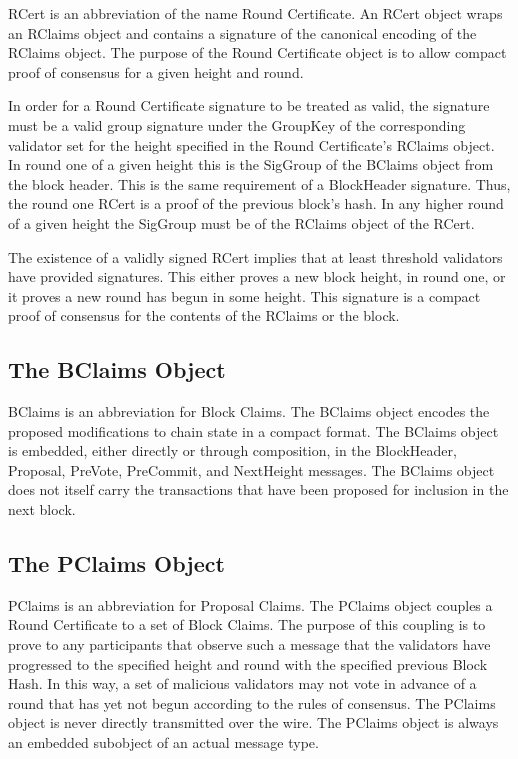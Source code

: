 

RCert is an abbreviation of the name Round Certificate.
An RCert object wraps an RClaims object and contains a signature of the
canonical encoding of the RClaims object.
The purpose of the Round Certificate object is to allow compact proof
of consensus for a given height and round.

In order for a Round Certificate signature to be treated as valid, the
signature must be a valid group signature under the GroupKey of the
corresponding validator set for the height specified in the Round
Certificate’s RClaims object.
In round one of a given height this is the SigGroup of the BClaims
object from the block header.
This is the same requirement of a BlockHeader signature.
Thus, the round one RCert is a proof of the previous block’s hash.
In any higher round of a given height the SigGroup must be of the
RClaims object of the RCert.

The existence of a validly signed RCert implies that at least threshold
validators have provided signatures.
This either proves a new block height, in round one, or it proves a new
round has begun in some height.
This signature is a compact proof of consensus for the contents of the
RClaims or the block.


\subsection{The BClaims Object}

BClaims is an abbreviation for Block Claims.
The BClaims object encodes the proposed modifications to chain state in
a compact format.
The BClaims object is embedded, either directly or through composition,
in the BlockHeader, Proposal, PreVote, PreCommit, and NextHeight
messages.
The BClaims object does not itself carry the transactions that have
been proposed for inclusion in the next block.


\subsection{The PClaims Object}

PClaims is an abbreviation for Proposal Claims.
The PClaims object couples a Round Certificate to a set of Block Claims.
The purpose of this coupling is to prove to any participants that
observe such a message that the validators have progressed to the
specified height and round with the specified previous Block Hash.
In this way, a set of malicious validators may not vote in advance of a
round that has yet not begun according to the rules of consensus.
The PClaims object is never directly transmitted over the wire.
The PClaims object is always an embedded subobject of an actual message
type.


